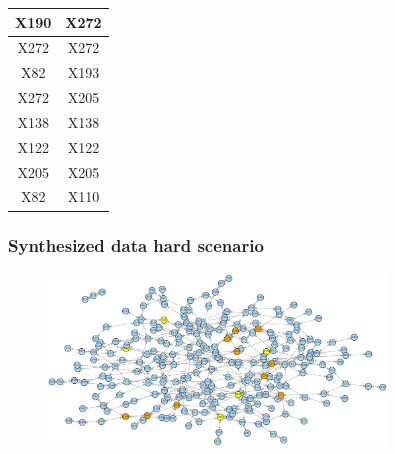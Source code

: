 \documentclass{beamer}
\newcommand{\boz}{\cellcolor{pathwaynode}}
\begin{document}
\begin{frame}[plain]
\begin{textblock*}{\paperwidth}
\begin{tabular}{| c c |}
\boz X190   &  \boz X272  \\ \hline
\boz X272   &  \boz X272  \\ \hline
\boz X82   &  \boz X193  \\ \hline
\boz X272   &  X205  \\ \hline
X138   &  X138  \\ \hline
X122   &  X122  \\ \hline
X205   &  X205  \\ \hline
\boz X82   &  X110  \\ \hline
    \end{tabular}
    \hspace{.5em}
  \end{textblock*}
\end{frame}

\begin{frame}[plain]
  \frametitle{Synthesized data hard scenario}
  \begin{figure}
    \includegraphics[width=0.8\textwidth]{synthesized-hard}
  \end{figure}
\end{frame}
\end{document}
